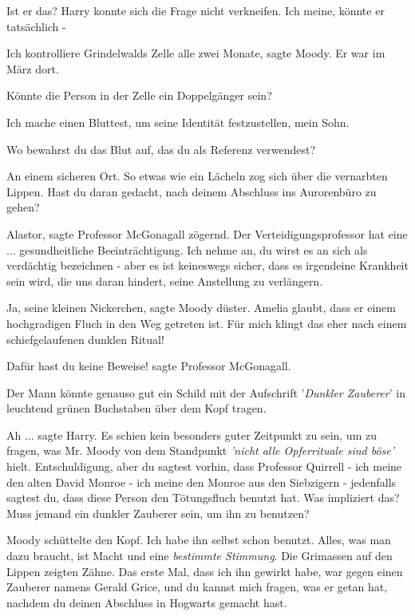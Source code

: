\glqq{}Ist er das?\grqq{} Harry konnte sich die Frage nicht verkneifen. \glqq{}Ich
meine, könnte er tatsächlich -\grqq{}

\glqq{}Ich kontrolliere Grindelwalds Zelle alle zwei Monate\grqq{}, sagte Moody.
\glqq{}Er war im März dort.\grqq{}

\glqq{}Könnte die Person in der Zelle ein Doppelgänger sein?\grqq{}

\glqq{}Ich mache einen Bluttest, um seine Identität festzustellen, mein
Sohn.\grqq{}

\glqq{}Wo bewahrst du das Blut auf, das du als Referenz verwendest?\grqq{}

\glqq{}An einem sicheren Ort.\grqq{} So etwas wie ein Lächeln zog sich über die
vernarbten Lippen. \glqq{}Hast du daran gedacht, nach deinem Abschluss ins
Aurorenbüro zu gehen?\grqq{}

\glqq{}Alastor\grqq{}, sagte Professor McGonagall zögernd. \glqq{}Der
Verteidigungsprofessor hat eine ... gesundheitliche Beeinträchtigung. Ich nehme
an, du wirst es an sich als verdächtig bezeichnen - aber es ist keineswegs
sicher, dass es irgendeine Krankheit sein wird, die uns daran hindert, seine
Anstellung zu verlängern.\grqq{}

\glqq{}Ja, seine kleinen Nickerchen\grqq{}, sagte Moody düster. \glqq{}Amelia
glaubt, dass er einem hochgradigen Fluch in den Weg getreten ist. Für mich
klingt das eher nach einem schiefgelaufenen dunklen Ritual!\grqq{}

\glqq{}Dafür hast du keine Beweise!\grqq{} sagte Professor McGonagall.

\glqq{}Der Mann könnte genauso gut ein Schild mit der Aufschrift '\emph{Dunkler
Zauberer}' in leuchtend grünen Buchstaben über dem Kopf tragen.\grqq{}

\glqq{}Ah ...\grqq{} sagte Harry. Es schien kein besonders guter Zeitpunkt zu
sein, um zu fragen, was Mr. Moody von dem Standpunkt \emph{'nicht alle
Opferrituale sind böse'} hielt. \glqq{}Entschuldigung, aber du sagtest vorhin,
dass Professor Quirrell - ich meine den alten David Monroe - ich meine den
Monroe aus den Siebzigern - jedenfalls sagtest du, dass diese Person den
Tötungsfluch benutzt hat. Was impliziert das? Muss jemand ein dunkler Zauberer
sein, um ihn zu benutzen?\grqq{}

Moody schüttelte den Kopf. \glqq{}Ich habe ihn selbst schon benutzt. Alles, was
man dazu braucht, ist Macht und eine \emph{bestimmte Stimmung}.\grqq{} Die
Grimassen auf den Lippen zeigten Zähne. \glqq{}Das erste Mal, dass ich ihn
gewirkt habe, war gegen einen Zauberer namens Gerald Grice, und du kannst mich
fragen, was er getan hat, nachdem du deinen Abschluss in Hogwarts gemacht
hast.\grqq{}

